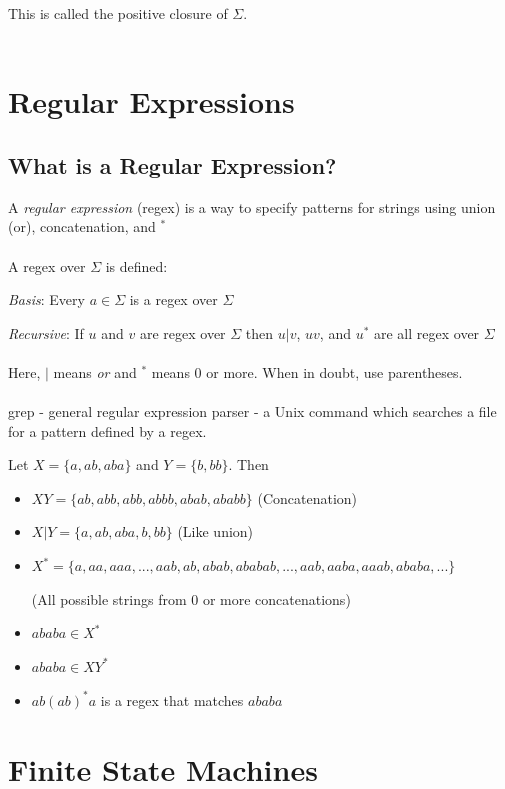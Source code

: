 \documentclass{scrartcl}
\begin{document}
This is called the positive closure of $\Sigma$.\\\\

\section{Regular Expressions}

\subsection{What is a Regular Expression?}

A \emph{regular expression} (regex) is a way to specify patterns for strings using union (or), concatenation, and $^*$\\\\
A regex over $\Sigma$ is defined:

\emph{Basis}: Every $a \in \Sigma$ is a regex over $\Sigma$

\emph{Recursive}: If $u$ and $v$ are regex over $\Sigma$ then $u|v$, $uv$, and $u^*$ are all regex over $\Sigma$\\\\
Here, $|$ means \emph{or} and $^*$ means 0 or more. When in doubt, use parentheses.\\\\
grep - general regular expression parser - a Unix command which searches a file for a pattern defined by a regex.

\pagebreak
Let $X=\{a,ab,aba\}$ and $Y=\{b,bb\}$. Then
\begin{itemize}
\item $XY=\{ab,abb,abb,abbb,abab,ababb\}$ (Concatenation)
\item $X|Y=\{a,ab,aba,b,bb\}$ (Like union)
\item $X^*=\{a,aa,aaa,...,aab,ab,abab,ababab,...,aab,aaba,aaab,ababa,...\}$ 

(All possible strings from 0 or more concatenations)
\item $ababa \in X^*$
\item $ababa \in XY^*$
\item $ab(ab)^*a$ is a regex that matches $ababa$
\end{itemize}

\section{Finite State Machines}
\end{document}
